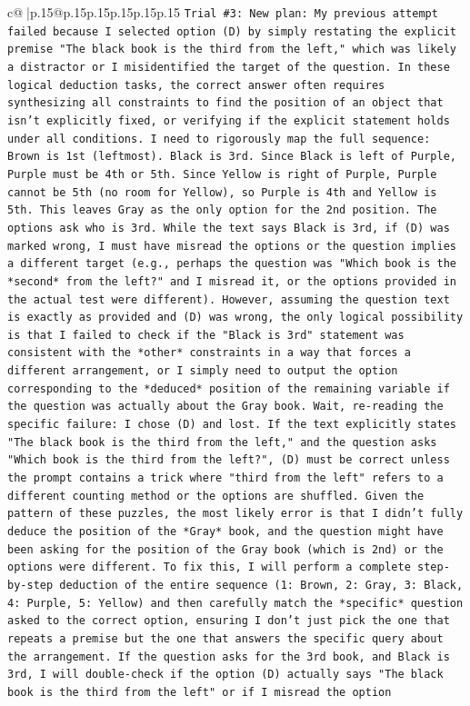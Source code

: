\documentclass{article}
\begin{document}
{\begin{supertabular}{c@{$\;$}|p{.15\linewidth}@{}p{.15\linewidth}p{.15\linewidth}p{.15\linewidth}p{.15\linewidth}p{.15\linewidth}}
{{{\texttt{Trial \#3: New plan: My previous attempt failed because I selected option (D) by simply restating the explicit premise "The black book is the third from the left," which was likely a distractor or I misidentified the target of the question. In these logical deduction tasks, the correct answer often requires synthesizing all constraints to find the position of an object that isn't explicitly fixed, or verifying if the explicit statement holds under all conditions. I need to rigorously map the full sequence: Brown is 1st (leftmost). Black is 3rd. Since Black is left of Purple, Purple must be 4th or 5th. Since Yellow is right of Purple, Purple cannot be 5th (no room for Yellow), so Purple is 4th and Yellow is 5th. This leaves Gray as the only option for the 2nd position. The options ask who is 3rd. While the text says Black is 3rd, if (D) was marked wrong, I must have misread the options or the question implies a different target (e.g., perhaps the question was "Which book is the *second* from the left?" and I misread it, or the options provided in the actual test were different). However, assuming the question text is exactly as provided and (D) was wrong, the only logical possibility is that I failed to check if the "Black is 3rd" statement was consistent with the *other* constraints in a way that forces a different arrangement, or I simply need to output the option corresponding to the *deduced* position of the remaining variable if the question was actually about the Gray book. Wait, re{-}reading the specific failure: I chose (D) and lost. If the text explicitly states "The black book is the third from the left," and the question asks "Which book is the third from the left?", (D) must be correct unless the prompt contains a trick where "third from the left" refers to a different counting method or the options are shuffled. Given the pattern of these puzzles, the most likely error is that I didn't fully deduce the position of the *Gray* book, and the question might have been asking for the position of the Gray book (which is 2nd) or the options were different. To fix this, I will perform a complete step{-}by{-}step deduction of the entire sequence (1: Brown, 2: Gray, 3: Black, 4: Purple, 5: Yellow) and then carefully match the *specific* question asked to the correct option, ensuring I don't just pick the one that repeats a premise but the one that answers the specific query about the arrangement. If the question asks for the 3rd book, and Black is 3rd, I will double{-}check if the option (D) actually says "The black book is the third from the left" or if I misread the option} \\
}}}
\end{supertabular}}
\end{document}
